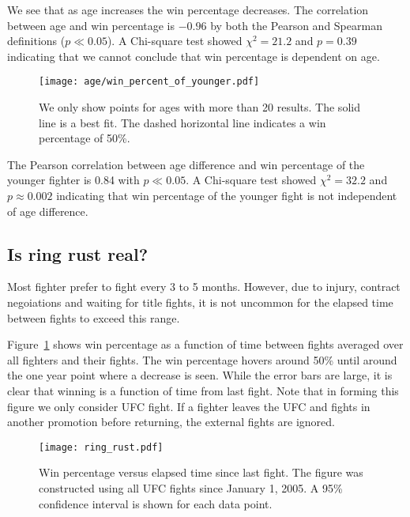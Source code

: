 We see that as age increases the win percentage decreases. The
correlation between age and win percentage is $-0.96$ by both
the Pearson and Spearman definitions ($p \ll 0.05$). A Chi-square
test showed $\chi^2=21.2$ and $p=0.39$ indicating that we cannot
conclude that win percentage is dependent on age.

\begin{figure}[h]
\begin{center}
\texttt{[image: age/win\_percent\_of\_younger.pdf]}
\caption{We only show points for ages with more than 20 results. The
solid line is a best fit. The dashed horizontal line indicates
a win percentage of 50\%.}
\end{center}
\end{figure}

The Pearson correlation between age difference and win percentage of the
younger fighter is 0.84 with $p \ll 0.05$. A Chi-square
test showed $\chi^2=32.2$ and $p \approx 0.002$ indicating that win percentage
of the younger fight is not independent of age difference.

\subsection*{Is ring rust real?}

Most fighter prefer to fight every 3 to 5 months. However, due to injury,
contract negoiations and waiting for title fights, it is not uncommon
for the elapsed time between fights to exceed this range.

Figure~\ref{ring_rust} shows win percentage as a function
of time between fights averaged over all fighters and their fights.
The win percentage hovers around 50\% until around the one year
point where a decrease is seen. While the error bars are large, it
is clear that winning is a function of time from last fight.
Note that in forming this figure we only consider UFC fight. If a fighter
leaves the UFC and fights in another promotion before returning, the
external fights are ignored.

\begin{figure}[h]
\begin{center}
\texttt{[image: ring\_rust.pdf]}
\caption{Win percentage versus elapsed time since last fight. The figure
was constructed using all UFC fights since January 1, 2005. A
95\% confidence interval is shown for each data point.}
\label{ring_rust}
\end{center}
\end{figure}

